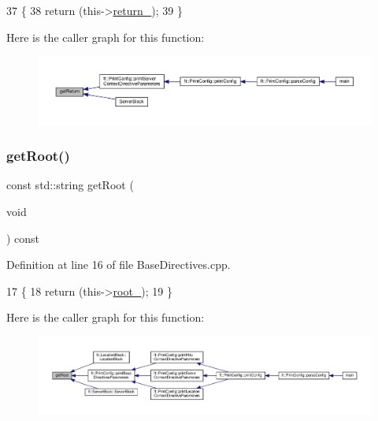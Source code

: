 \begin{DoxyCode}
37     \{
38         \textcolor{keywordflow}{return} (this->\hyperlink{classft_1_1_server_block_abab721f365aff66f8a1289de21c8f01f}{return\_});
39     \}
\end{DoxyCode}
Here is the caller graph for this function\+:
\nopagebreak
\begin{figure}[H]
\begin{center}
\leavevmode
\includegraphics[width=350pt]{classft_1_1_server_block_aeef5e4710c02406c46e54d4aa0c8f57c_icgraph}
\end{center}
\end{figure}
\mbox{\label{classft_1_1_base_directives_aa5dbcb08bda0a0e7e502d2df7cf64287}} 
\subsubsection{\texorpdfstring{get\+Root()}{getRoot()}}
{\footnotesize\ttfamily const std\+::string get\+Root (\begin{DoxyParamCaption}\item[{void}]{ }\end{DoxyParamCaption}) const\hspace{0.3cm}{\ttfamily [inherited]}}



Definition at line 16 of file Base\+Directives.\+cpp.


\begin{DoxyCode}
17     \{
18         \textcolor{keywordflow}{return} (this->\hyperlink{classft_1_1_base_directives_abb1eaf0bba10b90172d6152e69457dc7}{root\_});
19     \}
\end{DoxyCode}
Here is the caller graph for this function\+:
\nopagebreak
\begin{figure}[H]
\begin{center}
\leavevmode
\includegraphics[width=350pt]{classft_1_1_base_directives_aa5dbcb08bda0a0e7e502d2df7cf64287_icgraph}
\end{center}
\end{figure}
\mbox{\label{classft_1_1_server_block_aa14d06f644ee8148fa9e2ee53d9625f9}} 
